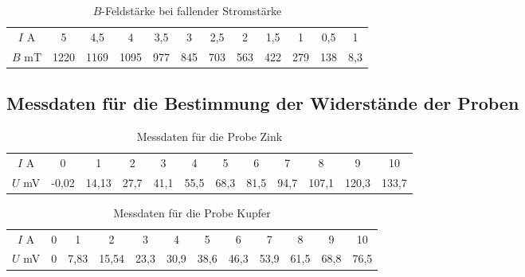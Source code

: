 \begin{table}
 \centering
 \label{tab:Messergebnisse_Feldstärke_Ifällt}
 \begin{tabular}[width=\textwidth]{S| S[table-format=4.0] S[table-format=4.1] S[table-format=4.0] S[table-format=3.1] S[table-format=3.0] S[table-format=3.1] S[table-format=3.0] S[table-format=3.1] S[table-format=3.0] S[table-format=3.1] S[table-format=3.1]}

     \midrule
      $I$  \si{\ampere} & 5 & 4,5 & 4 & 3,5 & 3 & 2,5 & 2 & 1,5 & 1 & 0,5 & 1 \\
      $B$  \si{\milli\tesla} & 1220 & 1169 & 1095 & 977 & 845 & 703 & 563 & 422 & 279 & 138 & 8,3 \\
      \bottomrule
\end{tabular}
  \caption{$B$-Feldstärke bei fallender Stromstärke}
\end{table}
\FloatBarrier

\subsection{Messdaten für die Bestimmung der Widerstände der Proben}

\begin{table}
 \centering
 \label{tab:Spannung_Zink}
 \begin{tabular}[width=\textwidth]{S| S[table-format=2.2] S[table-format=2.2] S[table-format=2.1] S[table-format=2.1] S[table-format=2.1] S[table-format=2.1] S[table-format=2.1] S[table-format=2.1] S[table-format=3.1] S[table-format=3.1] S[table-format=3.1]}

     \midrule
      $I$  \si{\ampere} & 0 & 1 & 2 & 3 & 4 & 5 & 6 & 7 & 8 & 9 & 10 \\
      $U$  \si{\milli\volt} & -0,02 & 14,13 & 27,7 & 41,1 & 55,5 & 68,3 & 81,5 & 94,7 & 107,1 & 120,3 & 133,7 \\
      \bottomrule
\end{tabular}
  \caption{Messdaten für die Probe Zink}
\end{table}


\begin{table}
 \centering
 \label{tab:Spannung_Kupfer}
 \begin{tabular}[width=\textwidth]{S| S[table-format=1.2] S[table-format=2.2] S[table-format=2.1] S[table-format=2.1] S[table-format=2.1] S[table-format=2.1] S[table-format=2.1] S[table-format=2.1] S[table-format=3.1] S[table-format=3.1] S[table-format=3.1]}

     \midrule
      $I$  \si{\ampere} & 0 & 1 & 2 & 3 & 4 & 5 & 6 & 7 & 8 & 9 & 10 \\
      $U$  \si{\milli\volt} & 0 & 7,83 & 15,54 & 23,3 & 30,9 & 38,6 & 46,3 & 53,9 & 61,5 & 68,8 & 76,5\\
      \bottomrule
\end{tabular}
  \caption{Messdaten für die Probe Kupfer}
\end{table}
\FloatBarrier

